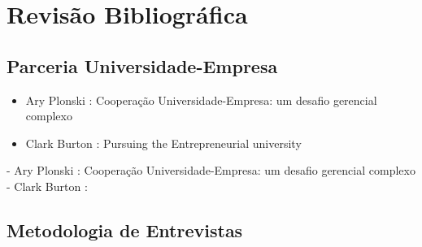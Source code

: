 \chapter[Revisão Bibliográfica]{Revisão Bibliográfica}
\label{chap:revisao}

\section{Parceria Universidade-Empresa}
\label{cha:ensino}
\begin{itemize}
\item Ary Plonski : Cooperação Universidade-Empresa: um desafio gerencial complexo
\item Clark Burton : Pursuing the Entrepreneurial university
\end{itemize}
- Ary Plonski : Cooperação Universidade-Empresa: um desafio gerencial complexo
- Clark Burton :

\section{Metodologia de Entrevistas}
\label{cha:ensino}
